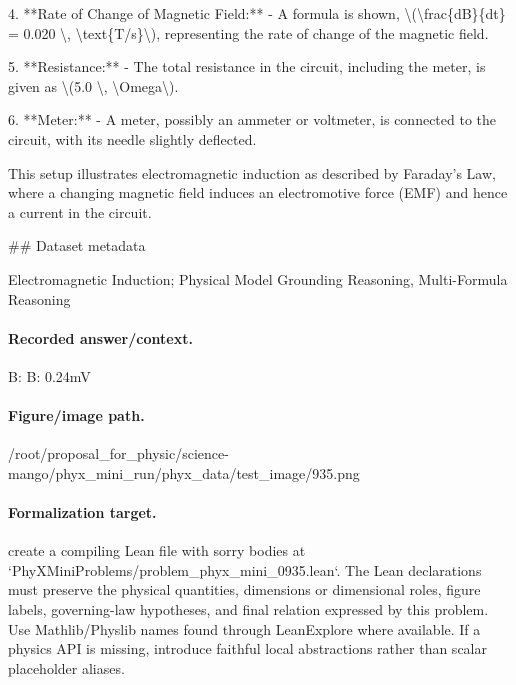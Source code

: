 4. **Rate of Change of Magnetic Field:**
   - A formula is shown, \textbackslash{}(\textbackslash{}frac\{dB\}\{dt\} = 0.020 \textbackslash{}, \textbackslash{}text\{T/s\}\textbackslash{}), representing the rate of change of the magnetic field.

5. **Resistance:**
   - The total resistance in the circuit, including the meter, is given as \textbackslash{}(5.0 \textbackslash{}, \textbackslash{}Omega\textbackslash{}).

6. **Meter:**
   - A meter, possibly an ammeter or voltmeter, is connected to the circuit, with its needle slightly deflected.

This setup illustrates electromagnetic induction as described by Faraday's Law, where a changing magnetic field induces an electromotive force (EMF) and hence a current in the circuit.

\#\# Dataset metadata

Electromagnetic Induction; Physical Model Grounding Reasoning, Multi-Formula Reasoning

\paragraph{Recorded answer/context.}
B: B: 0.24mV

\paragraph{Figure/image path.}
/root/proposal\_for\_physic/science-mango/phyx\_mini\_run/phyx\_data/test\_image/935.png

\paragraph{Formalization target.}
create a compiling Lean file with sorry bodies at `PhyXMiniProblems/problem\_phyx\_mini\_0935.lean`. The Lean declarations must preserve the physical quantities, dimensions or dimensional roles, figure labels, governing-law hypotheses, and final relation expressed by this problem.
Use Mathlib/Physlib names found through LeanExplore where available. If a physics API is missing, introduce faithful local abstractions rather than scalar placeholder aliases.


